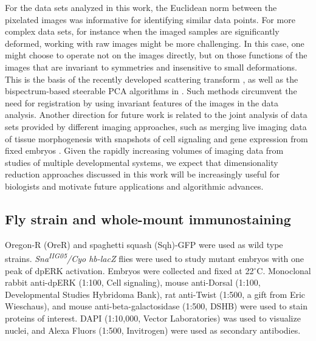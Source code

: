 \documentclass{pnastwo}
\begin{document}
\begin{article}
For the data sets analyzed in this work, the Euclidean norm between the pixelated images was informative for identifying similar data points. 
%
For more complex data sets, for instance when the imaged samples are significantly deformed, working with raw images might be more challenging.   
%
In this case, one might choose to operate not on the images directly, but on those functions of the images that are invariant to symmetries and insensitive to small deformations.  
%
This is the basis of the recently developed scattering transform \cite{mallat2012group}, as well as the bispectrum-based steerable PCA algorithms in \cite{zhao2014rotationally}. 
%
Such methods circumvent the need for registration by using invariant features of the images in the data analysis.
%
Another direction for future work is related to the joint analysis of data sets provided by different imaging approaches, such as merging live imaging data of tissue morphogenesis with snapshots of cell signaling and gene expression from fixed embryos \cite{krzic2012multiview, ichikawa2014live, rubel2010coupling}. 
%
Given the rapidly increasing volumes of imaging data from studies of multiple developmental systems, we expect that dimensionality reduction approaches discussed in this work will be increasingly useful for biologists and motivate future applications and algorithmic advances. 
  





\begin{materials}

\section{Fly strain and whole-mount immunostaining}
%
Oregon-R (OreR) and spaghetti squash (Sqh)-GFP were used as wild type strains. 
%
{\it Sna\textsuperscript{\it IIG05}/Cyo hb-lacZ} flies were used to study mutant embryos with one peak of dpERK activation.  
%
Embryos were collected and fixed at 22$^\circ$C. 
%
Monoclonal rabbit anti-dpERK (1:100, Cell signaling), mouse anti-Dorsal (1:100, Developmental Studies Hybridoma Bank), rat anti-Twist (1:500, a gift from Eric Wieschaus), and mouse anti-beta-galactosidase (1:500, DSHB) were used to stain proteins of interest. DAPI (1:10,000, Vector Laboratories) was used to visualize nuclei, and Alexa Fluors (1:500, Invitrogen) were used as secondary antibodies. 


\end{materials}
\end{article}
\end{document}
